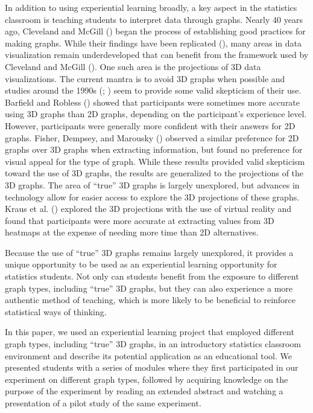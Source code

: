 \documentclass[
  12pt,
]{article}
\begin{document}
In addition to using experiential learning broadly, a key aspect in the
statistics classroom is teaching students to interpret data through
graphs. Nearly 40 years ago, Cleveland and McGill
() began the process of establishing
good practices for making graphs. While their findings have been
replicated (), many areas
in data visualization remain underdeveloped that can benefit from the
framework used by Cleveland and McGill
(). One such area is the projections
of 3D data visualizations. The current mantra is to avoid 3D graphs when
possible and studies around the 1990s
(;
) seem to
provide some valid skepticism of their use. Barfield and Robless
() showed that participants were
sometimes more accurate using 3D graphs than 2D graphs, depending on the
participant's experience level. However, participants were generally
more confident with their answers for 2D graphs. Fisher, Dempsey, and
Marousky () observed a similar preference
for 2D graphs over 3D graphs when extracting information, but found no
preference for visual appeal for the type of graph. While these results
provided valid skepticism toward the use of 3D graphs, the results are
generalized to the projections of the 3D graphs. The area of ``true'' 3D
graphs is largely unexplored, but advances in technology allow for
easier access to explore the 3D projections of these graphs. Kraus et
al. () explored the 3D projections with
the use of virtual reality and found that participants were more
accurate at extracting values from 3D heatmaps at the expense of needing
more time than 2D alternatives.

Because the use of ``true'' 3D graphs remains largely unexplored, it
provides a unique opportunity to be used as an experiential learning
opportunity for statistics students. Not only can students benefit from
the exposure to different graph types, including ``true'' 3D graphs, but
they can also experience a more authentic method of teaching, which is
more likely to be beneficial to reinforce statistical ways of thinking.

In this paper, we used an experiential learning project that employed
different graph types, including ``true'' 3D graphs, in an introductory
statistics classroom environment and describe its potential application
as an educational tool. We presented students with a series of modules
where they first participated in our experiment on different graph
types, followed by acquiring knowledge on the purpose of the experiment
by reading an extended abstract and watching a presentation of a pilot
study of the same experiment.
\end{document}
